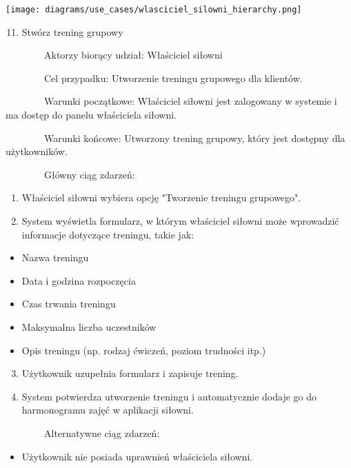 \documentclass[
]{article}
\providecommand{\tightlist}{%
  \setlength{\itemsep}{0pt}\setlength{\parskip}{0pt}}
\begin{document}
{\texttt{[image: diagrams/use\_cases/wlasciciel\_silowni\_hierarchy.png]}}

\begin{enumerate}
\setcounter{enumi}{10}
\tightlist
\item
  {Stwórz trening grupowy}
\end{enumerate}

{~~~~~~~~}{Aktorzy biorący udział: Właściciel siłowni}

{~~~~~~~~Cel przypadku: Utworzenie treningu grupowego dla klientów.}

{~~~~~~~~Warunki początkowe: Właściciel siłowni jest zalogowany w
systemie i ma dostęp do panelu właściciela siłowni.}

{~~~~~~~~Warunki końcowe: Utworzony trening grupowy, który jest dostępny
dla użytkowników.}

{~~~~~~~~Główny ciąg zdarzeń:}

\begin{enumerate}
\tightlist
\item
  {Właściciel siłowni wybiera opcję "Tworzenie treningu grupowego".}
\item
  {System wyświetla formularz, w którym właściciel siłowni może
  wprowadzić informacje dotyczące treningu, takie jak:}
\end{enumerate}

\begin{itemize}
\tightlist
\item
  {Nazwa treningu}
\item
  {Data i godzina rozpoczęcia}
\item
  {Czas trwania treningu}
\item
  {Maksymalna liczba uczestników}
\item
  {Opis treningu (np. rodzaj ćwiczeń, poziom trudności itp.)}
\end{itemize}

\begin{enumerate}
\setcounter{enumi}{2}
\tightlist
\item
  {Użytkownik uzupełnia formularz i zapisuje trening.}
\item
  {System potwierdza utworzenie treningu i automatycznie dodaje go do
  harmonogramu zajęć w aplikacji siłowni.}
\end{enumerate}

{~~~~~~~~Alternatywne ciąg zdarzeń:}

\begin{itemize}
\tightlist
\item
  {Użytkownik nie posiada uprawnień właściciela siłowni.}
\end{itemize}
\end{document}
